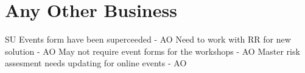 \documentclass[11pt,hacksoc]{meetingmins}
\begin{document}
\section{Any Other Business}
\begin{items}
\item SU Events form have been superceeded - AO
\subitem Need to work with RR for new solution - AO
\subitem May not require event forms for the workshops - AO
\subitem Master risk assesment needs updating for online events - AO
\end{items}

\vspace{1em}
\end{document}
